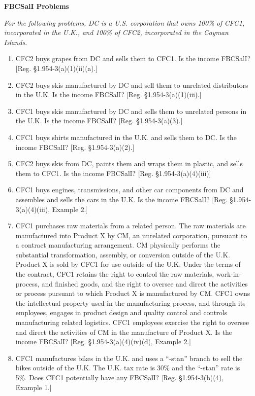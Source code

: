 	
	\begin{center}
		\textbf{FBCSalI Problems}
	\end{center}
	\begin{select}
	\emph{For the following problems, DC is a U.S. corporation that owns 100\% of CFC1, incorporated in the U.K., and 100\% of CFC2, incorporated in the Cayman Islands.}
			\begin{enumerate}
				\item CFC2 buys grapes from DC and sells them to CFC1.  Is the income FBCSalI?  [Reg. \S 1.954-3(a)(1)(ii)(a).]
				\item CFC2 buys skis manufactured by DC and sell them to unrelated distributors in the U.K.  Is the income FBCSalI? [Reg. \S 1.954-3(a)(1)(iii).]
				\item CFC1 buys skis manufactured by DC and sells them to unrelated persons in the U.K.  Is the income FBCSalI? [Reg. \S 1.954-3(a)(3).]
				\item CFC1 buys shirts manufactured in the U.K. and sells them to DC. Is the income FBCSalI? [Reg. \S 1.954-3(a)(2).]
				\item CFC2 buys skis from DC, paints them and wraps them in plastic, and sells them to CFC1.  Is the income FBCSalI? [Reg. \S 1.954-3(a)(4)(iii)]
				\item CFC1 buys engines, transmissions, and other car components from DC and assembles and sells the cars in the U.K.  Is the income FBCSalI? [Reg. \S 1.954-3(a)(4)(iii), Example 2.]
				\item CFC1 purchases raw materials from a related person. The raw materials are manufactured into Product X by CM, an unrelated corporation, pursuant to a contract manufacturing arrangement. CM physically performs the substantial transformation, assembly, or conversion outside of the U.K.  Product X is sold by CFC1 for use outside of the U.K.  Under the terms of the contract, CFC1 retains the right to control the raw materials, work-in-process, and finished goods, and the right to oversee and direct the activities or process pursuant to which Product X is manufactured by CM. CFC1 owns the intellectual property used in the manufacturing process, and through its employees, engages in product design and quality control and controls manufacturing related logistics. CFC1 employees exercise the right to oversee and direct the activities of CM in the manufacture of Product X.  Is the income FBCSalI? [Reg. \S 1.954-3(a)(4)(iv)(d), Example 2.]
				\item CFC1 manufactures bikes in the U.K. and uses a ``-stan'' branch to sell the bikes outside of the U.K.  The U.K. tax rate is 30\% and the ``-stan'' rate is 5\%.  Does CFC1 potentially have any FBCSalI?   [Reg. \S 1.954-3(b)(4), Example 1.]

\end{enumerate}
\end{select}
